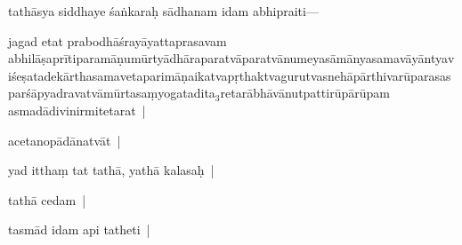 \documentclass[article,12pt,a4paper]{memoir}%
\newcounter{parCount}
\begin{document}
	  \pstart \leavevmode%
	\label{thakur75-39.1}\label{sarit__ratnakīrtinibandhāvali__102493}tathāsya siddhaye śaṅkaraḥ sādhanam idam abhipraiti—
	{}
	\pend%
      

	  \pstart \leavevmode%
	jagad etat prabodhāśrayāyattaprasavam \label{rnā__102330}abhilāṣa\label{rnā__102368}prītiparamāṇumūrtyādhāraparatvāparatvānumeyasāmānyasamavāyāntyaviśeṣatadekārthasamavetaparimāṇaikatvapṛthaktvagurutvasnehāpārthivarūparasasparśāpyadravatvāmūrtasaṃyogatadita{\tiny $_{3}$}retarābhāvānutpattirūpārūpam asmadādivinirmitetarat |
	{}
	\pend%
      

	  \pstart \leavevmode%
	acetanopādānatvāt |
	{}
	\pend%
      

	  \pstart \leavevmode%
	yad itthaṃ tat tathā, yathā kalasaḥ |
	{}
	\pend%
      

	  \pstart \leavevmode%
	tathā cedam |
	{}
	\pend%
      

	  \pstart \leavevmode%
	tasmād idam api tatheti |\label{sarit__ratnakīrtinibandhāvali__103091}
	{}
	\pend%
      
\end{document}
